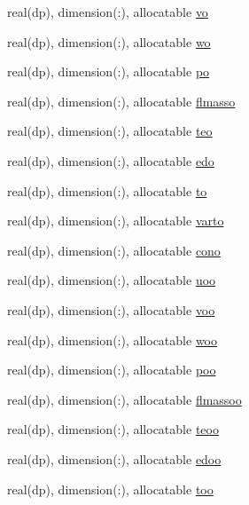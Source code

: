 \begin{DoxyCompactItemize}
\item 
real(dp), dimension(\-:), allocatable \hyperlink{classvariables_a8e3c73f60505e097eebbe0a368d08e55}{vo}
\item 
real(dp), dimension(\-:), allocatable \hyperlink{classvariables_a70b466d97bf23be72e5bce7f20689933}{wo}
\item 
real(dp), dimension(\-:), allocatable \hyperlink{classvariables_aba75282f2242d09c60d5f407f42aa8c6}{po}
\item 
real(dp), dimension(\-:), allocatable \hyperlink{classvariables_ab2aeaa8c9334d39e39a8c0830e501759}{flmasso}
\item 
real(dp), dimension(\-:), allocatable \hyperlink{classvariables_a6514ba664210b8f30c32f4c268a78564}{teo}
\item 
real(dp), dimension(\-:), allocatable \hyperlink{classvariables_a4115296d169e26d3ea3a3e03cf798387}{edo}
\item 
real(dp), dimension(\-:), allocatable \hyperlink{classvariables_a77b6b14011022f80505967f9eac4eb4e}{to}
\item 
real(dp), dimension(\-:), allocatable \hyperlink{classvariables_afc0fa9dbdf81c0a52f1559984dc3c4c0}{varto}
\item 
real(dp), dimension(\-:), allocatable \hyperlink{classvariables_abb6179a83e9c5a00689665fafbc348a8}{cono}
\item 
real(dp), dimension(\-:), allocatable \hyperlink{classvariables_aae50fbc08e6752d2b5bd47e821623365}{uoo}
\item 
real(dp), dimension(\-:), allocatable \hyperlink{classvariables_a5822aea71754a3cd7092d949a83b2791}{voo}
\item 
real(dp), dimension(\-:), allocatable \hyperlink{classvariables_adca212df59d44fece82e4874774071ec}{woo}
\item 
real(dp), dimension(\-:), allocatable \hyperlink{classvariables_a2f189f01a368381032270b6c0a9edf2e}{poo}
\item 
real(dp), dimension(\-:), allocatable \hyperlink{classvariables_a947f8f15a029a013d7ec18f0af476c2a}{flmassoo}
\item 
real(dp), dimension(\-:), allocatable \hyperlink{classvariables_abab989916e0b0662f3b34317ef327935}{teoo}
\item 
real(dp), dimension(\-:), allocatable \hyperlink{classvariables_ab301c0d89bffdb529a9c8b09e280744d}{edoo}
\item 
real(dp), dimension(\-:), allocatable \hyperlink{classvariables_ab152916ec1bb4dc1ca22f1463e57a532}{too}
\item 

\end{DoxyCompactItemize}
